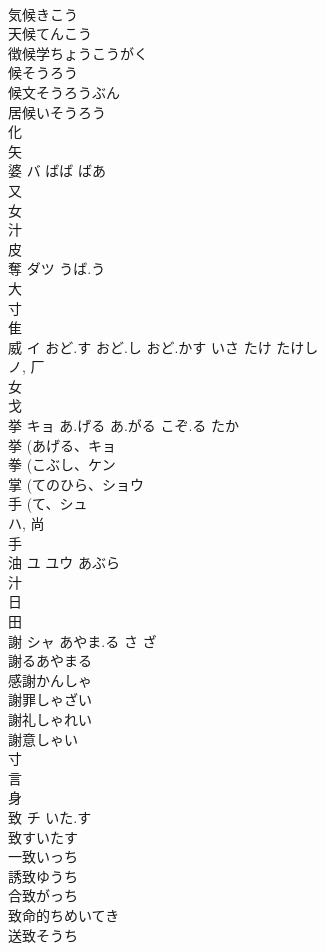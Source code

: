 \documentclass[8pt]{extreport}
\begin{document}
\begin{CJK}{UTF8}{min}
\\	気候きこう
\\	天候てんこう
\\	徴候学ちょうこうがく
\\	候そうろう
\\	候文そうろうぶん
\\	居候いそうろう
\\	化 
\\	矢 
\\	婆	バ	ばば ばあ	
\\	又 
\\	女 
\\	汁 
\\	皮 
\\	奪	ダツ	うば.う	
\\	大 
\\	寸 
\\	隹 
\\	威	イ	おど.す おど.し おど.かす いさ たけ たけし	
\\	ノ, 厂 
\\	女 
\\	戈 
\\	挙	キョ	あ.げる あ.がる こぞ.る たか	
\\	挙 (あげる、キョ 
\\	拳 (こぶし、ケン 
\\	掌 (てのひら、ショウ 
\\	手 (て、シュ 
\\	ハ, 尚 
\\	手 
\\	油	ユ ユウ	あぶら	
\\	汁 
\\	日 
\\	田 
\\	謝	シャ	あやま.る さ ざ	
\\	謝るあやまる 
\\	感謝かんしゃ 
\\	謝罪しゃざい 
\\	謝礼しゃれい 
\\	謝意しゃい 
\\	寸 
\\	言 
\\	身 
\\	致	チ	いた.す	
\\	致すいたす
\\	一致いっち
\\	誘致ゆうち
\\	合致がっち
\\	致命的ちめいてき
\\	送致そうち

\end{CJK}
\end{document}
